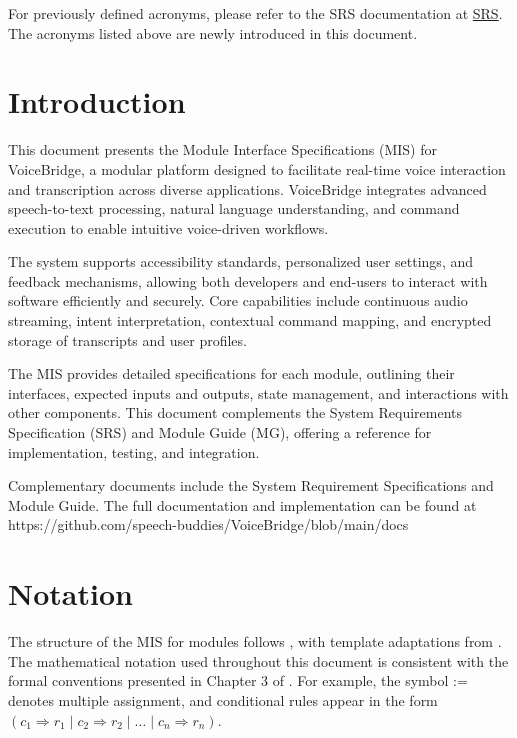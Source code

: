 \documentclass[12pt, titlepage]{article}
\begin{document}
\vspace{1em}

\noindent
For previously defined acronyms, please refer to the SRS documentation at
\href{https://github.com/speech-buddies/VoiceBridge/blob/main/docs/SRS-Volere/SRS.pdf}{SRS}.
The acronyms listed above are newly introduced in this document.
\newpage

\tableofcontents

\newpage


\section{Introduction}

This document presents the Module Interface Specifications (MIS) for VoiceBridge, a modular platform 
designed to facilitate real-time voice interaction and transcription across diverse applications. 
VoiceBridge integrates advanced speech-to-text processing, natural language understanding, 
and command execution to enable intuitive voice-driven workflows.

The system supports accessibility standards, personalized user settings, and feedback mechanisms, 
allowing both developers and end-users to interact with software efficiently and securely. 
Core capabilities include continuous audio streaming, intent interpretation, contextual command 
mapping, and encrypted storage of transcripts and user profiles.

The MIS provides detailed specifications for each module, outlining their interfaces, expected inputs 
and outputs, state management, and interactions with other components. This document complements 
the System Requirements Specification (SRS) and Module Guide (MG), offering a reference for 
implementation, testing, and integration.

Complementary documents include the System Requirement Specifications
and Module Guide.  The full documentation and implementation can be
found at {https://github.com/speech-buddies/VoiceBridge/blob/main/docs}



\section{Notation}

The structure of the MIS for modules follows \citet{HoffmanAndStrooper1995},
with template adaptations from \citet{GhezziEtAl2003}.  
The mathematical notation used throughout this document is consistent with the
formal conventions presented in Chapter 3 of \citet{HoffmanAndStrooper1995}.
For example, the symbol := denotes multiple assignment, and conditional rules
appear in the form $(c_1 \Rightarrow r_1 \mid c_2 \Rightarrow r_2 \mid \dots \mid c_n \Rightarrow r_n)$.
\end{document}
